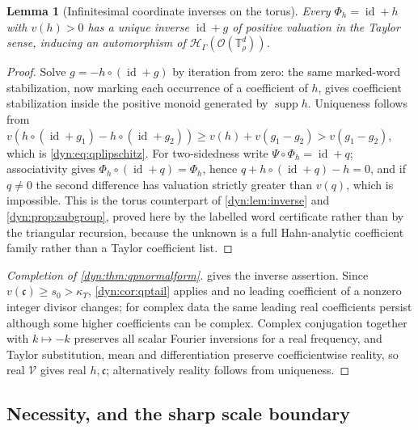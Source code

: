 \documentclass[11pt,letterpaper]{article}
\newtheorem{lemma}[lemma]{Lemma}
\theoremstyle{definition}
\theoremstyle{remark}
\newcommand{\HH}{\mathscr H}
\newcommand{\OO}{\mathcal O}
\newcommand{\id}{\operatorname{id}}
\newcommand{\supp}{\operatorname{supp}}
\newcommand{\TT}{\mathbb T}
\newcommand{\strip}{\OO(\TT^{d}_{\rho})}
\newcommand{\kups}{\kappa_{\Upsilon}}
\numberwithin{equation}{section}
\begin{document}
\begin{lemma}[Infinitesimal coordinate inverses on the torus]
\label{dyn:lem:qpcoordinverse}
Every $\Phi_h=\id+h$ with $v(h)>0$ has a unique inverse $\id+g$ of positive
valuation in the Taylor sense, inducing an automorphism of
$\HH_\Gamma(\strip)$.
\end{lemma}
\begin{proof}
Solve $g=-h\circ(\id+g)$ by iteration from zero: the same marked-word
stabilization, now marking each occurrence of a coefficient of $h$, gives
coefficient stabilization inside the positive monoid generated by
$\supp h$. Uniqueness follows from
$v(h\circ(\id+g_1)-h\circ(\id+g_2))\ge v(h)+v(g_1-g_2)>v(g_1-g_2)$, which
is \eqref{dyn:eq:qplipschitz}. For two-sidedness write
$\Psi\circ\Phi_h=\id+q$; associativity gives
$\Phi_h\circ(\id+q)=\Phi_h$, hence $q+h\circ(\id+q)-h=0$, and if $q\ne0$
the second difference has valuation strictly greater than $v(q)$, which is
impossible. This is the torus counterpart of \cref{dyn:lem:inverse} and
\cref{dyn:prop:subgroup}, proved here by the labelled word certificate
rather than by the triangular recursion, because the unknown is a full
Hahn-analytic coefficient family rather than a Taylor coefficient list.
\end{proof}

\begin{proof}[Completion of \cref{dyn:thm:qpnormalform}]
 gives the inverse assertion. Since
$v(\mathfrak c)\ge s_0>\kups$, \cref{dyn:cor:qptail} applies and no leading
coefficient of a nonzero integer divisor changes; for complex data the same
leading real coefficients persist although some higher coefficients can be
complex. Complex conjugation together with $k\mapsto-k$ preserves all
scalar Fourier inversions for a real frequency, and Taylor substitution,
mean and differentiation preserve coefficientwise reality, so real
$\mathcal V$ gives real $h,\mathfrak c$; alternatively reality follows from
uniqueness.
\end{proof}

\subsection{Necessity, and the sharp scale boundary}
\label{dyn:subsec:qpnecessity}
\end{document}
